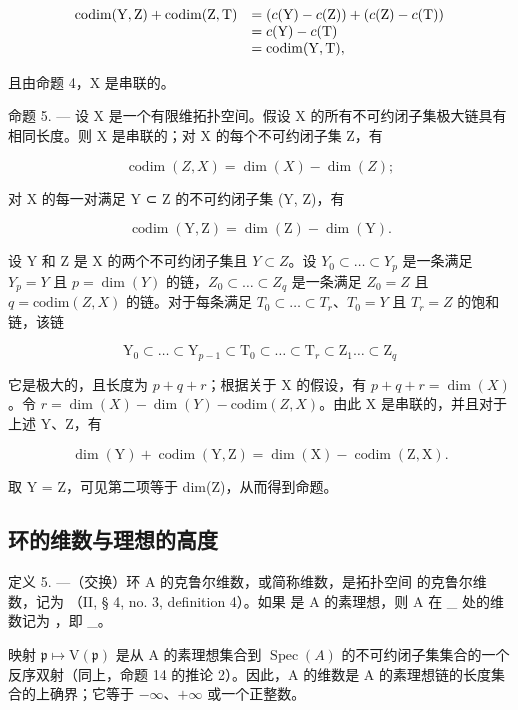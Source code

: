 \[
\begin{array}{r l} \operatorname{codim} (\mathrm{Y}, \mathrm{Z}) + \operatorname{codim} (\mathrm{Z}, \mathrm{T}) & = (c (\mathrm{Y}) - c (\mathrm{Z})) + (c (\mathrm{Z}) - c (\mathrm{T})) \\ & = c (\mathrm{Y}) - c (\mathrm{T}) \\ & = \operatorname{codim} (\mathrm{Y}, \mathrm{T}), \end{array}
\]

且由命题 4，X 是串联的。

命题 5. — 设 X 是一个有限维拓扑空间。假设 X 的所有不可约闭子集极大链具有相同长度。则 X 是串联的；对 X 的每个不可约闭子集 Z，有

\[
\operatorname{codim} (Z, X) = \dim (X) - \dim (Z);
\]

对 X 的每一对满足 Y ⊂ Z 的不可约闭子集 (Y, Z)，有

\[
\operatorname{codim} (\mathrm{Y}, \mathrm{Z}) = \dim (\mathrm{Z}) - \dim (\mathrm{Y}).
\]

设 Y 和 Z 是 X 的两个不可约闭子集且 \(Y \subset Z\)。设 \(Y_{0} \subset \ldots \subset Y_{p}\) 是一条满足 \(Y_{p} = Y\) 且 \(p = \dim(Y)\) 的链，\(Z_{0} \subset \ldots \subset Z_{q}\) 是一条满足 \(Z_{0} = Z\) 且 \(q = \text{codim}(Z, X)\) 的链。对于每条满足 \(T_{0} \subset \ldots \subset T_{r}\)、\(T_{0} = Y\) 且 \(T_{r} = Z\) 的饱和链，该链

\[
\mathrm{Y} _ {0} \subset \dots \subset \mathrm{Y} _ {p - 1} \subset \mathrm{T} _ {0} \subset \dots \subset \mathrm{T} _ {r} \subset \mathrm{Z} _ {1} \dots \subset \mathrm{Z} _ {q}
\]

它是极大的，且长度为 \(p + q + r\)；根据关于 X 的假设，有 \(p + q + r = \dim(X)\)。令 \(r = \dim(X) - \dim(Y) - \text{codim}(Z, X)\)。由此 X 是串联的，并且对于上述 Y、Z，有

\[
\dim (\mathrm{Y}) + \operatorname{codim} (\mathrm{Y}, \mathrm{Z}) = \dim (\mathrm{X}) - \operatorname{codim} (\mathrm{Z}, \mathrm{X}).
\]

取 Y = Z，可见第二项等于 dim(Z)，从而得到命题。

\subsection{环的维数与理想的高度}

定义 5. —（交换）环 A 的克鲁尔维数，或简称维数，是拓扑空间  的克鲁尔维数，记为  （II, § 4, no. 3, definition 4）。如果  是 A 的素理想，则 A 在 \_ 处的维数记为 ，即 \_。

映射 \(\mathfrak{p} \mapsto \mathrm{V}(\mathfrak{p})\) 是从 A 的素理想集合到 \(\operatorname{Spec}(A)\) 的不可约闭子集集合的一个反序双射（同上，命题 14 的推论 2）。因此，A 的维数是 A 的素理想链的长度集合的上确界；它等于 \(-\infty\)、\(+\infty\) 或一个正整数。

